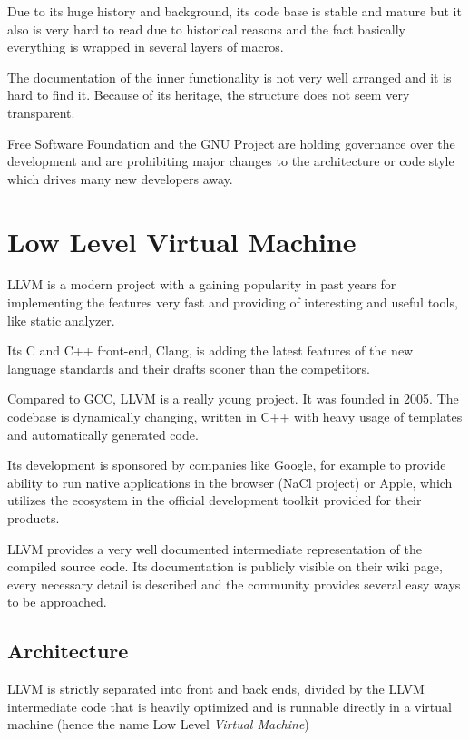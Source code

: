     Due to its huge history and background, its code base is stable and mature but it also is very hard to read due to historical reasons and the fact basically everything is wrapped in several layers of macros.

    The documentation of the inner functionality is not very well arranged and it is hard to find it. Because of its heritage, the structure does not seem very transparent.

    Free Software Foundation and the GNU Project are holding governance over the development and are prohibiting major changes to the architecture or code style which drives many new developers away.

    \section{Low Level Virtual Machine}\label{llvm}

    LLVM is a modern project with a gaining popularity in past years for implementing the features very fast and providing of interesting and useful tools, like static analyzer.

    Its C and C++ front-end, Clang, is adding the latest features of the new language standards and their drafts sooner than the competitors.

    Compared to GCC, LLVM is a really young project. It was founded in 2005. The codebase is dynamically changing, written in C++ with heavy usage of templates and automatically generated code.

    Its development is sponsored by companies like Google, for example to provide ability to run native applications in the browser (NaCl project) or Apple, which utilizes the ecosystem in the official development toolkit provided for their products.

    LLVM provides a very well documented intermediate representation of the compiled source code. Its documentation is publicly visible on their wiki page, every necessary detail is described and the community provides several easy ways to be approached.

        \subsection{Architecture}

        LLVM is strictly separated into front and back ends, divided by the LLVM intermediate code that is heavily optimized and is runnable directly in a virtual machine (hence the name Low Level \emph{Virtual Machine})

